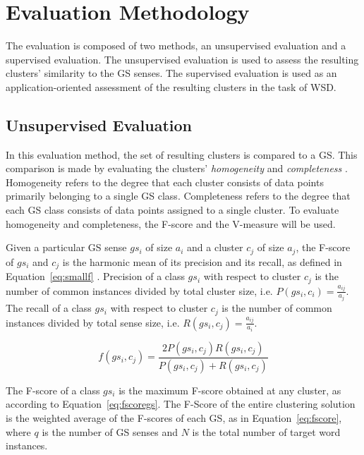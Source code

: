 \section{Evaluation Methodology}
\label{sec:eval-method}

The evaluation is composed of two methods, an unsupervised evaluation and a
supervised evaluation. The unsupervised evaluation is used to assess the
resulting clusters' similarity to the \acf{GS} senses. The supervised evaluation
is used as an application-oriented assessment of the resulting clusters in the
task of \ac{WSD}.

\subsection{Unsupervised Evaluation}
\label{subsec:unsupeval}

In this evaluation method, the set of resulting clusters is compared to a
\ac{GS}. This comparison is made by evaluating the clusters'
\textit{homogeneity} and \textit{completeness} \citep{manandhar2009semeval}. 
Homogeneity refers to the degree that each cluster consists of data points 
primarily belonging to a single \ac{GS} class. Completeness refers to the 
degree that each \ac{GS} class consists of data points assigned to a single 
cluster. To evaluate homogeneity and completeness, the F-score and the 
V-measure will be used.

Given a particular \ac{GS} sense $gs_i$ of size $a_i$ and a cluster $c_j$ of
size $a_j$, the F-score of $gs_i$ and $c_j$ is the harmonic mean of its
precision and its recall, as defined in Equation~\ref{eq:smallf}
\citep{agirre2007semeval}. Precision of a class $gs_i$ with respect to cluster
$c_j$ is the number of common instances divided by total cluster size, i.e.
$P(gs_i, c_i) = \frac{a_{ij}}{a_j}$. The recall of a class $gs_i$ with respect
to cluster $c_j$ is the number of common instances divided by total sense size,
i.e. $R(gs_i, c_j) = \frac{a_ {ij}}{a_i}$.

\begin{equation} \label{eq:smallf}
 f(gs_i, c_j) = \frac{2P(gs_i,c_j)R(gs_i,c_j)}
                     {P(gs_i,c_j) + R(gs_i,c_j)}
\end{equation}

The F-score of a class $gs_i$ is the maximum F-score obtained at any cluster, as
according to Equation~\ref{eq:fscoregs}. The F-Score of the entire clustering
solution is the weighted average of the F-scores of each \ac{GS}, as in
Equation~\ref{eq:fscore}, where $q$ is the number of \ac{GS} senses and $N$ is
the total number of target word instances.

